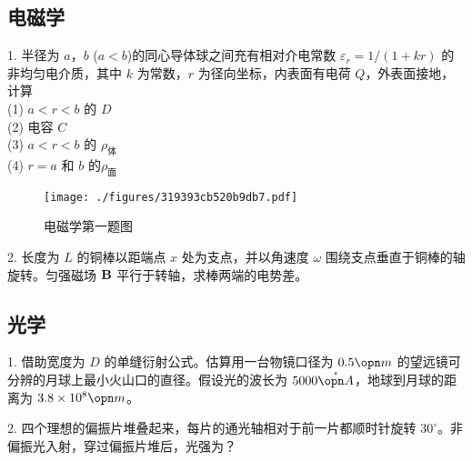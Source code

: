 \subsection{电磁学}
1. 半径为 $a$，$b$ ($a<b$)的同心导体球之间充有相对介电常数 $\varepsilon_r=1/(1+kr)$ 的非均匀电介质，其中 $k$ 为常数，$r$ 为径向坐标，内表面有电荷 $Q$，外表面接地，计算\\
(1) $ a<r<b $ 的 $D$\\
(2) 电容 $C$\\
(3) $ a<r<b $ 的 $\rho_{\text{体}}$\\
(4) $ r=a $ 和 $b$ 的$\rho_{\text{面}}$
\begin{figure}[ht]
\centering
\texttt{[image: ./figures/319393cb520b9db7.pdf]}
\caption{电磁学第一题图} \label{fig_NJU12_4}
\end{figure}
2. 长度为 $L$ 的铜棒以距端点 $x$ 处为支点，并以角速度 $\omega$ 围绕支点垂直于铜棒的轴旋转。匀强磁场 $\bf B$ 平行于转轴，求棒两端的电势差。
\subsection{光学}
1. 借助宽度为 $D$ 的单缝衍射公式。估算用一台物镜口径为 $0.5 \opn m$ 的望远镜可分辨的月球上最小火山口的直径。假设光的波长为 $5000\mathring{\opn A}$，地球到月球的距离为 $3.8\times 10^8 \opn m$。

2. 四个理想的偏振片堆叠起来，每片的通光轴相对于前一片都顺时针旋转 $30^\circ$。非偏振光入射，穿过偏振片堆后，光强为？